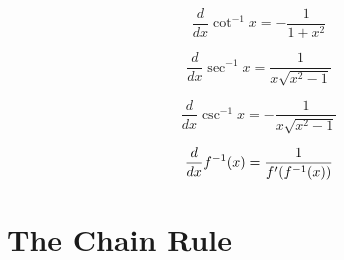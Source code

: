 \documentclass{report}
\begin{document}
\begin{equation}
  \frac{d}{dx} \cot ^{-1} x = -\frac{1}{1+x^2}
  \label{eq:Derivative of arccot x}
\end{equation}

\begin{equation}
  \frac{d}{dx} \sec ^{-1} x = \frac{1}{x \sqrt{x^2 - 1}}
  \label{eq:Derivative of arcsec x}
\end{equation}

\begin{equation}
  \frac{d}{dx} \csc ^{-1} x = -\frac{1}{x \sqrt{x^2 - 1}}
  \label{eq:Derivative of arccsc x}
\end{equation}

\begin{equation}
  \frac{d}{dx} f^{-1}(x) = \frac{1}{f'(f^{-1}(x))}
  \label{eq:Derivative of f^{-1}(x)}
\end{equation}


\section{The Chain Rule}
\end{document}
